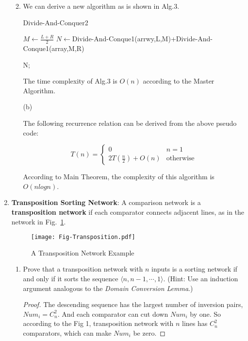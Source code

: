 \documentclass[12pt,a4paper]{article}
\makeatletter
\newtheorem*{solution}{Solution}
\theoremstyle{definition}
\renewenvironment{solution}[1][Solution] {\par\pushQED{\qed}\normalfont\topsep6\p@\@plus6\p@\relax\trivlist\item[\hskip\labelsep\bfseries#1\@addpunct{.}]\ignorespaces}{\popQED\endtrivlist\@endpefalse} \makeatother
\makeatother
\begin{document}
\begin{enumerate}
\begin{enumerate}
\begin{solution}
	We can derive a new algorithm as is shown in Alg.3.
	
	 \begin{minipage}[t]{0.9\textwidth}
		\begin{algorithm}[H]
			\BlankLine
			\caption{Divide-And-Conquer2}
			\label{Alg-selectionsort}
			\BlankLine
			$M\leftarrow\frac{L+R}{2}$\;
			$N\leftarrow$Divide-And-Conque1(arrwy,L,M)+Divide-And-Conque1(array,M,R)\;
			
			{
				
			
				\Return N;
			}
			
		\end{algorithm}
	\end{minipage}
		The time complexity of Alg.3 is $O(n)$ according to the Master Algorithm.
		
		(b)
		
		The following recurrence relation can be derived from the above pseudo code:
		\begin{center}
			$$T(n)=
			\begin{cases}
			0&  n=1\\
			2T(\frac{n}{2})+O(n)& \text{otherwise}
			\end{cases}$$
		\end{center}
	
		According to Main Theorem, the complexity of this algorithm is $O(nlogn)$.
        \end{solution}
    \end{enumerate}
	
    \item
    \textbf{Transposition Sorting Network}: A comparison network is a \textbf{transposition network}  if each comparator connects adjacent lines, as in the network in Fig.~\ref{Fig-Transposition}.

    \begin{figure}[htbp]
        \centering
        \texttt{[image: Fig-Transposition.pdf]}
        \caption{A Transposition Network Example}\label{Fig-Transposition}
    \end{figure}
    
    \begin{enumerate}
        \item
        Prove that a transposition network with $n$ inputs is a sorting network if and only if it sorts the sequence $\langle n, n-1, \cdots, 1 \rangle$. {\color{blue}(Hint: Use an induction argument analogous to the \emph{Domain Conversion Lemma}.)}
        \begin{proof}
			The descending sequence has the largest number of inversion pairs, $Num_i=C_n^2$. And each comparator can cut down $Num_i$ by one. So according to the Fig 1, transposition network with $n$ lines has $C_n^2$ comparators, which can make $Num_i$ be zero.
			

\end{proof}
\end{enumerate}
\end{enumerate}
\end{document}
